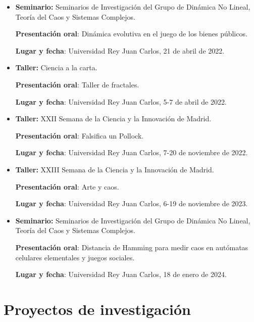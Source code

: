 \begin{itemize}

\item
\textbf{Seminario:} Seminarios de Investigación del Grupo de Dinámica No Lineal, Teoría del Caos y Sistemas Complejos.

\textbf{Presentación oral}: Dinámica evolutiva en el juego de los bienes públicos.



\textbf{Lugar y fecha}: Universidad Rey Juan Carlos, 21 de abril de 2022.

\item
\textbf{Taller:} Ciencia a la carta.

\textbf{Presentación oral}: Taller de fractales.

\textbf{Lugar y fecha}: Universidad Rey Juan Carlos, 5-7 de abril de 2022.

\item
\textbf{Taller:} XXII Semana de la Ciencia y la Innovación de Madrid.

\textbf{Presentación oral}: Falsifica un Pollock.

\textbf{Lugar y fecha}: Universidad Rey Juan Carlos, 7-20 de noviembre de 2022.

\item
\textbf{Taller:} XXIII Semana de la Ciencia y la Innovación de Madrid.

\textbf{Presentación oral}: Arte y caos.

\textbf{Lugar y fecha}: Universidad Rey Juan Carlos, 6-19 de noviembre de 2023.

\item
\textbf{Seminario:} Seminarios de Investigación del Grupo de Dinámica No Lineal, Teoría del Caos y Sistemas Complejos.

\textbf{Presentación oral}: Distancia de Hamming para medir caos en autómatas celulares elementales y juegos sociales.

\textbf{Lugar y fecha}: Universidad Rey Juan Carlos, 18 de enero de 2024.

\end{itemize}


\section*{Proyectos de investigación}

